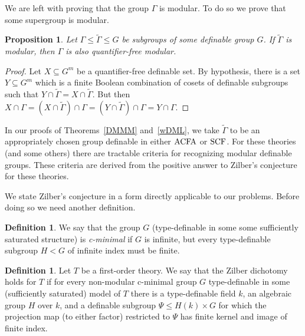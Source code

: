 \documentclass{amsart}
\newcommand{\ACFA}{{\rm ACFA}}
\newcommand{\SCF}{{\rm SCF}}
\newtheorem{prop}[thm]{Proposition}
\theoremstyle{definition}
\newtheorem{Def}[thm]{Definition}
\theoremstyle{remark}
\begin{document}
We are left with proving that the group $\Gamma$ is modular.  To do so 
we prove that some supergroup is modular.

\begin{prop}
Let $\Gamma \leq \widetilde{\Gamma} \leq G$ be subgroups of some 
definable group $G$.  If $\widetilde{\Gamma}$ is modular, then
$\Gamma$ is also quantifier-free modular.
\end{prop}
\begin{proof}
Let $X \subseteq G^m$ be a quantifier-free definable set.  By hypothesis, 
there is a set $Y \subseteq G^m$ which is a finite Boolean combination of 
cosets of definable subgroups such that $Y \cap \widetilde{\Gamma} = X \cap \widetilde{\Gamma}$.
But then $X \cap \Gamma = (X \cap \widetilde{\Gamma}) \cap \Gamma = (Y \cap \widetilde{\Gamma}) \cap \Gamma = 
Y \cap \Gamma$.
\end{proof}



In our proofs of Theorems~\ref{DMMM} and~\ref{wDML}, we take $\widetilde{\Gamma}$ to be 
an appropriately chosen group definable in either $\ACFA$ or $\SCF$.  For these theories (and 
some others) there are tractable criteria for recognizing modular definable groups.   These criteria
are derived from the positive answer to Zilber's conjecture for these theories.

We state Zilber's conjecture in a form directly applicable to our problems.  Before doing so
we need another definition.

\begin{Def}
We say that the group $G$ (type-definable in some some sufficiently saturated structure) is 
\emph{c-minimal} if $G$ is infinite, but every type-definable subgroup $H < G$ of infinite
index must be finite.
\end{Def}

\begin{Def}
Let $T$ be a first-order theory.  We say that the Zilber dichotomy holds for $T$
if for every non-modular c-minimal group $G$ type-definable in some (sufficiently 
saturated) model of $T$ there
is a type-definable field $k$, an algebraic group $H$ over $k$, and a definable
subgroup $\Psi \leq H(k) \times G$ for which the projection map (to either factor) restricted
to $\Psi$ has finite kernel and image of finite index.
\end{Def}
\end{document}
